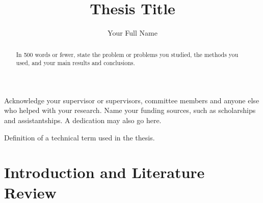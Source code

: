 \documentclass{upei-fos-thesis}
\title{Thesis Title}
\author{Your Full Name}
\begin{document}
\maketitle

\begin{abstract}
In 500 words or fewer, state the problem or problems you studied, the methods you
used, and your main results and conclusions.
\end{abstract}

\begin{acknowledgments}
Acknowledge your supervisor or supervisors, committee members and anyone else who
helped with your research. Name your funding sources, such as scholarships and
assistantships. A dedication may also go here.
\end{acknowledgments}

\tableofcontents
\listoffigures
\listoftables

\begin{abbreviations}
\end{abbreviations}

\begin{glossaryterms}
  \item[Term] Definition of a technical term used in the thesis.
\end{glossaryterms}

\mainmatter

\chapter{Introduction and Literature Review}
\end{document}
